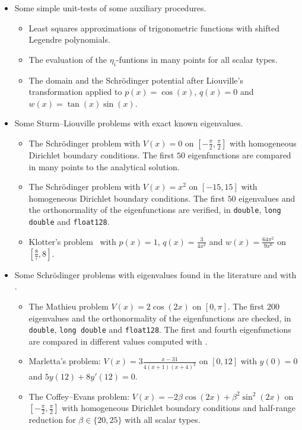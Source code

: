 \begin{itemize}
    \item Some simple unit-tests of some auxiliary procedures. \begin{itemize}
              \item Least squares approximations of trigonometric functions with shifted Legendre polynomials.
              \item The evaluation of the $\eta_i$-funtions in many points for all scalar types.
              \item The domain and the Schrödinger potential after Liouville's transformation applied to $p(x) = \cos(x)$, $q(x) = 0$ and $w(x) = \tan(x) \sin(x)$.
          \end{itemize}
    \item Some Sturm--Liouville problems with exact known eigenvalues. \begin{itemize}
              \item The Schrödinger problem with $V(x) = 0$ on $\left[-\frac{\pi}{2}, \frac{\pi}{2}\right]$ with homogeneous Dirichlet boundary conditions. The first $50$ eigenfunctions are compared in many points to the analytical solution.
              \item The Schrödinger problem with $V(x) = x^2$ on $\left[-15, 15\right]$ with homogeneous Dirichlet boundary conditions. The first $50$ eigenvalues and the orthonormality of the eigenfunctions are verified, in \texttt{double}, \texttt{long double} and \texttt{float128}.
              \item Klotter's problem~\cite{klotter_technische_1978} with $p(x) = 1$, $q(x) = \frac{3}{4x^2}$ and $w(x) = \frac{64\pi^2}{9 x^6}$ on $\left[\frac{8}{7}, 8\right]$.
          \end{itemize}
    \item Some Schrödinger problems with eigenvalues found in the literature and with .\begin{itemize}
              \item The Mathieu problem $V(x)= 2\cos(2x)$ on $[0, \pi]$. The first $200$ eigenvalues and the orthonormality of the eigenfunctions are checked, in \texttt{double}, \texttt{long double} and \texttt{float128}. The first and fourth eigenfunctions are compared in different values computed with .
              \item Marletta's problem: $V(x) = 3\frac{x-31}{4(x+1)(x+4)^2}$ on $[0,12]$ with $y(0) = 0$ and $5 y(12) + 8 y'(12) = 0$.
              \item The Coffey--Evans problem: $V(x) = -2 \beta \cos(2x) + \beta^2 \sin^2(2x)$ on $\left[-\frac{\pi}{2}, \frac{\pi}{2}\right]$ with homogeneous Dirichlet boundary conditions and half-range reduction for $\beta \in \{20, 25\}$ with all scalar types.

\end{itemize}
\end{itemize}
